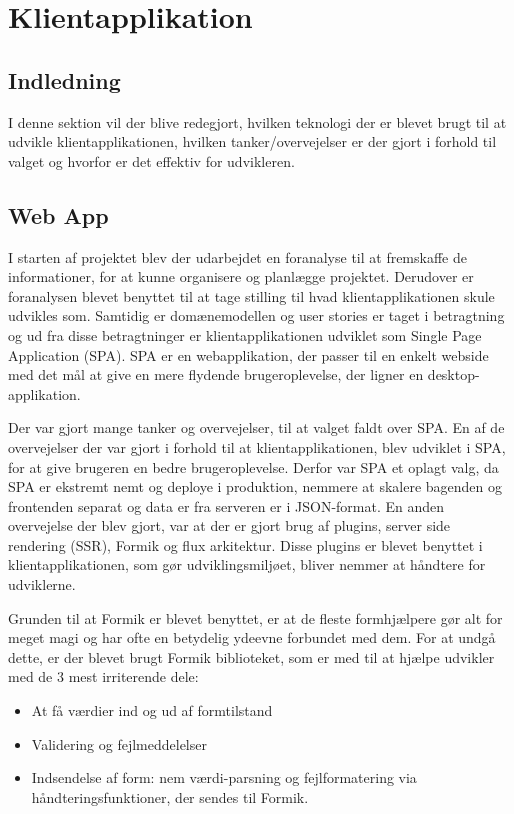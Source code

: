 \chapter{Klientapplikation}

\section{Indledning}
I denne sektion vil der blive redegjort, hvilken teknologi der er blevet brugt til at udvikle klientapplikationen, hvilken tanker/overvejelser er der gjort i forhold til valget og hvorfor er det effektiv for udvikleren.

\section{Web App}
I starten af projektet blev der udarbejdet en foranalyse til at fremskaffe de informationer, for at kunne organisere og planlægge projektet. Derudover er foranalysen blevet benyttet til at tage stilling til hvad klientapplikationen skule udvikles som. Samtidig er domænemodellen og user stories er taget i betragtning og ud fra disse betragtninger er klientapplikationen udviklet som Single Page Application (SPA). SPA er en webapplikation, der passer til en enkelt webside med det mål at give en mere flydende brugeroplevelse, der ligner en desktop-applikation. 

Der var gjort mange tanker og overvejelser, til at valget faldt over SPA. En af de overvejelser der var gjort i forhold til at klientapplikationen, blev udviklet i SPA, for at give brugeren en bedre brugeroplevelse. Derfor var SPA et oplagt valg, da SPA er ekstremt nemt og deploye i produktion, nemmere at skalere bagenden og frontenden separat og data er fra serveren er i JSON-format.
En anden overvejelse der blev gjort, var at der er gjort brug af plugins, server side rendering (SSR), Formik og flux arkitektur. Disse plugins er blevet benyttet i klientapplikationen, som gør udviklingsmiljøet, bliver nemmer at håndtere for udviklerne. 
 
Grunden til at Formik er blevet benyttet, er at de fleste formhjælpere gør alt for meget magi og har ofte en betydelig ydeevne forbundet med dem. For at undgå dette, er der blevet brugt Formik biblioteket, som er med til at hjælpe udvikler med de 3 mest irriterende dele:

\begin{itemize}
    \item At få værdier ind og ud af formtilstand
    \item  Validering og fejlmeddelelser
    \item  Indsendelse af form: nem værdi-parsning og fejlformatering via håndteringsfunktioner, der sendes til Formik.
\end{itemize}

